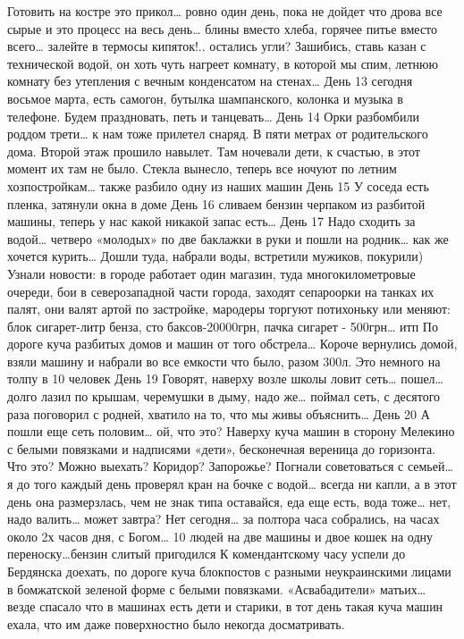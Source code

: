 Готовить на костре это прикол… ровно один день, пока не дойдет что дрова все сырые и это процесс на весь день… блины вместо хлеба, горячее питье вместо всего… залейте в термосы кипяток!.. остались угли? Зашибись, ставь казан с технической водой, он хоть чуть нагреет комнату, в которой мы спим, летнюю комнату без утепления с вечным конденсатом на стенах…
День 13 
сегодня восьмое марта, есть самогон, бутылка шампанского, колонка и музыка в телефоне. Будем праздновать, петь и танцевать…
День 14
Орки разбомбили роддом трети… к нам тоже прилетел снаряд. В пяти метрах от родительского дома. Второй этаж прошило навылет. Там ночевали дети, к счастью, в этот момент их там не было. Стекла вынесло, теперь все ночуют по летним хозпостройкам… также разбило одну из наших машин
День 15 
У соседа есть пленка, затянули окна в доме
День 16 
сливаем бензин черпаком из разбитой машины, теперь у нас какой никакой запас есть…
День 17
Надо сходить за водой… четверо «молодых» по две баклажки в руки и пошли на родник… как же хочется курить…
Дошли туда, набрали воды, встретили мужиков, покурили)
Узнали новости: в городе работает один магазин, туда многокилометровые очереди, бои в северозападной части города, заходят сепароорки на танках их палят, они валят артой по застройке, мародеры торгуют потихоньку или меняют: блок сигарет-литр бенза, сто баксов-20000грн, пачка сигарет - 500грн… итп
По дороге куча разбитых домов и машин от того обстрела…
Короче вернулись домой, взяли машину и набрали во все емкости что было, разом 300л. Это немного на толпу в 10 человек
День 19
Говорят, наверху возле школы ловит сеть… пошел… долго лазил по крышам, черемушки в дыму, надо же… поймал сеть, с десятого раза поговорил с родней, хватило на то, что мы живы объяснить…
День 20
А пошли еще сеть половим… ой, что это? Наверху куча машин в сторону Мелекино с белыми повязками и надписями «дети», бесконечная вереница до горизонта. Что это? Можно выехать? Коридор? Запорожье? Погнали советоваться с семьей… я до того каждый день проверял кран на бочке с водой… всегда ни капли, а в этот день она размерзлась, чем не знак типа оставайся, еда еще есть, вода тоже… нет, надо валить… может завтра? Нет сегодня… за полтора часа собрались, на часах около 2х часов дня, с Богом… 10 людей на две машины и двое кошек на одну переноску…бензин слитый пригодился
К комендантскому часу успели до Бердянска доехать, по дороге куча блокпостов с разными неукраинскими лицами в бомжатской зеленой форме с белыми повязками. «Асвабадители» матьих… везде спасало что в машинах есть дети и старики, в тот день такая куча машин ехала, что им даже поверхностно было некогда досматривать.

